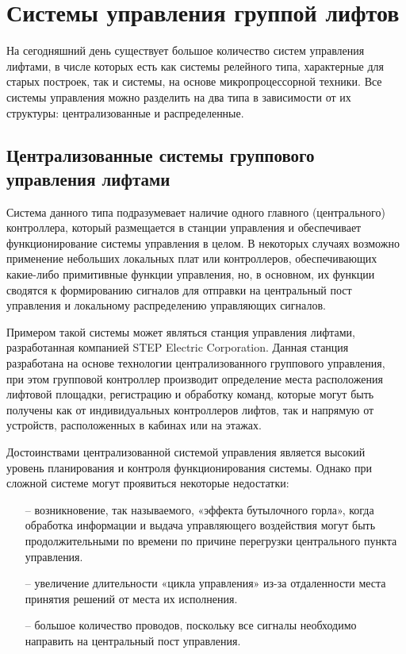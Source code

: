 \section{Системы управления группой лифтов}
	На сегодняшний день существует большое количество систем управления лифтами,
		в числе которых есть как системы релейного типа, характерные для старых построек,
		так и системы, на основе микропроцессорной техники.
		Все системы управления можно разделить на два типа в зависимости от их структуры:
		централизованные и распределенные.

	\subsection{Централизованные системы группового управления лифтами}
		Система данного типа подразумевает наличие одного главного (центрального) контроллера,
			который размещается в станции управления и обеспечивает функционирование системы управления в целом.
			В некоторых случаях возможно применение небольших локальных плат или контроллеров,
			обеспечивающих какие-либо примитивные функции управления, но, в основном,
			их функции сводятся к формированию сигналов для отправки на центральный пост
			управления и локальному распределению управляющих сигналов.
			
		Примером такой системы может являться станция управления лифтами,
			разработанная компанией STEP Electric Corporation.
			Данная станция разработана на основе технологии централизованного группового управления,
			при этом групповой контроллер производит определение места расположения лифтовой площадки,
			регистрацию и обработку команд, которые могут быть получены как от индивидуальных контроллеров лифтов,
			так и напрямую от устройств, расположенных в кабинах или на этажах.

		Достоинствами централизованной системой управления является высокий уровень планирования
			и контроля функционирования системы. Однако при сложной системе могут проявиться некоторые недостатки:
		\begin{itemize}
			\item[--] возникновение, так называемого, «эффекта бутылочного горла»,
				когда обработка информации и выдача управляющего воздействия могут
				быть продолжительными по времени по причине перегрузки центрального пункта управления.
			\item[--] увеличение длительности «цикла управления» из-за отдаленности
				места принятия решений от места их исполнения.
			\item[--] большое количество проводов, поскольку все сигналы необходимо
				направить на центральный пост управления.
		\end{itemize}
		
